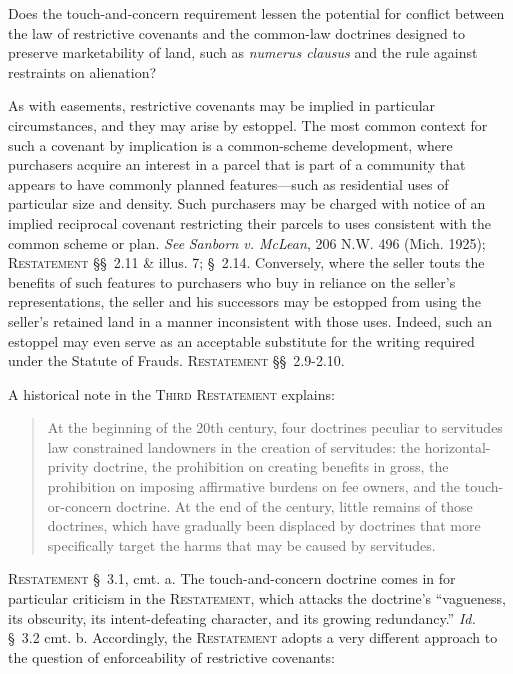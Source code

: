 
\item Does the touch-and-concern requirement lessen the potential for conflict
between the law of restrictive covenants and the common-law doctrines designed
to preserve marketability of land, such as \textit{numerus clausus} and the rule
against restraints on alienation?


\item As with easements, restrictive covenants may be implied in particular
circumstances, and they may arise by estoppel. The most common context for such
a covenant by implication is a common-scheme development, where purchasers
acquire an interest in a parcel that is part of a community that appears to have
commonly planned features---such as residential uses of particular size and
density. Such purchasers may be charged with notice of an implied reciprocal
covenant restricting their parcels to uses consistent with the common scheme or
plan. \textit{See} \emph{Sanborn v. McLean}, 206 N.W. 496 (Mich. 1925);
\textsc{Restatement} \S\S~2.11 \& illus. 7; \S~2.14. Conversely, where the
seller touts
the benefits of such features to purchasers who buy in reliance on the seller's
representations, the seller and his successors may be estopped from using the
seller's retained land in a manner inconsistent with those uses. Indeed, such an
estoppel may even serve as an acceptable substitute for the writing required
under the Statute of Frauds. \textsc{Restatement} \S\S~2.9-2.10.

\item A historical note in the \textsc{Third Restatement} explains: 
\begin{quote}
At the beginning of the 20th century, four doctrines peculiar to servitudes law
constrained landowners in the creation of servitudes: the horizontal-privity
doctrine, the prohibition on creating benefits in gross, the prohibition on
imposing affirmative burdens on fee owners, and the touch-or-concern doctrine.
At the end of the century, little remains of those doctrines, which have
gradually been displaced by doctrines that more specifically target the harms
that may be caused by servitudes. 
\end{quote}
\textsc{Restatement} \S~3.1, cmt. a. The touch-and-concern doctrine comes in for
particular criticism in the \textsc{Restatement}, which attacks the doctrine's
``vagueness, its obscurity, its intent-defeating character, and its growing
redundancy.'' \textit{Id.} \S~3.2 cmt. b. Accordingly, the \textsc{Restatement}
adopts a
very different approach to the question of enforceability of restrictive
covenants:


